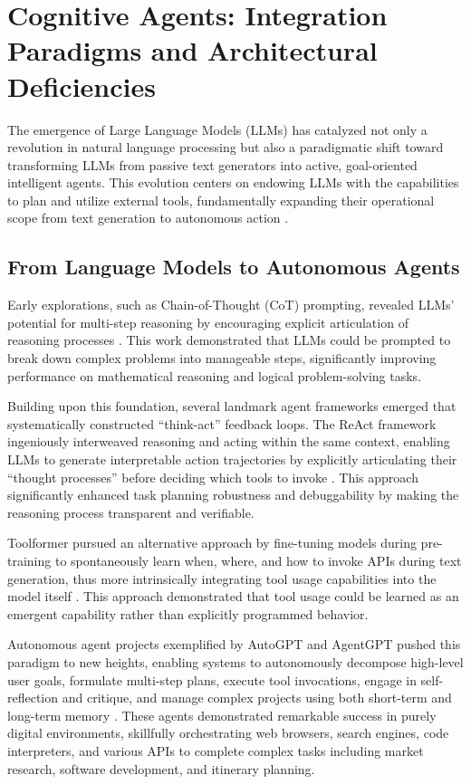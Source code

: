 \section{Cognitive Agents: Integration Paradigms and Architectural Deficiencies}

The emergence of Large Language Models (LLMs) has catalyzed not only a revolution in natural language processing but also a paradigmatic shift toward transforming LLMs from passive text generators into active, goal-oriented intelligent agents. This evolution centers on endowing LLMs with the capabilities to plan and utilize external tools, fundamentally expanding their operational scope from text generation to autonomous action \cite{mialon2023augmented}.

\subsection{From Language Models to Autonomous Agents}

Early explorations, such as Chain-of-Thought (CoT) prompting, revealed LLMs' potential for multi-step reasoning by encouraging explicit articulation of reasoning processes \cite{wei2022chain}. This work demonstrated that LLMs could be prompted to break down complex problems into manageable steps, significantly improving performance on mathematical reasoning and logical problem-solving tasks.

Building upon this foundation, several landmark agent frameworks emerged that systematically constructed ``think-act'' feedback loops. The ReAct framework ingeniously interweaved reasoning and acting within the same context, enabling LLMs to generate interpretable action trajectories by explicitly articulating their ``thought processes'' before deciding which tools to invoke \cite{yao2022react}. This approach significantly enhanced task planning robustness and debuggability by making the reasoning process transparent and verifiable.

Toolformer pursued an alternative approach by fine-tuning models during pre-training to spontaneously learn when, where, and how to invoke APIs during text generation, thus more intrinsically integrating tool usage capabilities into the model itself \cite{schick2023toolformer}. This approach demonstrated that tool usage could be learned as an emergent capability rather than explicitly programmed behavior.

Autonomous agent projects exemplified by AutoGPT and AgentGPT pushed this paradigm to new heights, enabling systems to autonomously decompose high-level user goals, formulate multi-step plans, execute tool invocations, engage in self-reflection and critique, and manage complex projects using both short-term and long-term memory \cite{richards2023autogpt}. These agents demonstrated remarkable success in purely digital environments, skillfully orchestrating web browsers, search engines, code interpreters, and various APIs to complete complex tasks including market research, software development, and itinerary planning.

